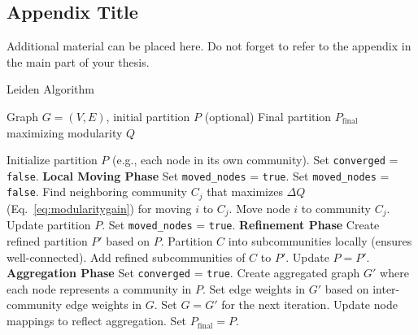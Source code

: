 \begin{appendix}
\chapter{Appendix Title}
\label{appendix:appendix}

Additional material can be placed here. Do not forget to refer to the appendix in the main part of your thesis.

\begin{algorithm}[H]
\caption{Leiden Algorithm}
\label{alg:leiden_appendix}
\begin{algorithmic}[1]
\Require Graph $G = (V, E)$, initial partition $P$ (optional)
\Ensure Final partition $P_{\text{final}}$ maximizing modularity $Q$

\State Initialize partition $P$ (e.g., each node in its own community).
\State Set \texttt{converged} = \texttt{false}.
    \State \textbf{Local Moving Phase}
    \State Set \texttt{moved\_nodes} = \texttt{true}.
        \State Set \texttt{moved\_nodes} = \texttt{false}.
            \State Find neighboring community $C_j$ that maximizes $\Delta Q$ (Eq.~\eqref{eq:modularitygain}) for moving $i$ to $C_j$.
                \State Move node $i$ to community $C_j$.
                \State Update partition $P$.
                \State Set \texttt{moved\_nodes} = \texttt{true}.
            \EndIf
        \EndFor
    \EndWhile
    \State \textbf{Refinement Phase}
    \State Create refined partition $P'$ based on $P$.
        \State Partition $C$ into subcommunities locally (ensures well-connected).
        \State Add refined subcommunities of $C$ to $P'$.
    \EndFor
    \State Update $P = P'$.
    \State \textbf{Aggregation Phase}
        \State Set \texttt{converged} = \texttt{true}.
    \Else
        \State Create aggregated graph $G'$ where each node represents a community in $P$.
        \State Set edge weights in $G'$ based on inter-community edge weights in $G$.
        \State Set $G = G'$ for the next iteration.
        \State Update node mappings to reflect aggregation.
    \EndIf
\EndWhile
\State Set $P_{\text{final}} = P$.
\end{algorithmic}
\end{algorithm}

\usepackage{longtable} %


\end{appendix}
